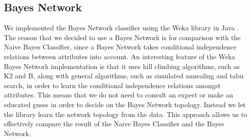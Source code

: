 \documentclass[11pt,oneside,reqno]{amsart}
\theoremstyle{definition}
\theoremstyle{definition}
\theoremstyle{remark}
\numberwithin{equation}{section}
\numberwithin{equation}{section}
\begin{document}
\subsection{Bayes Network}
We implemented the Bayes Network classifier using the Weka library in Java \cite{Weka}. The reason that we decided to use a Bayes Network is for comparison with the Naive Bayes Classifier, since a Bayes Network takes conditional independence relations between attributes into account. An interesting feature of the Weka Bayes Network implementation is that it uses hill climbing algorithms, such as K2 and B, along with general algorithms, such as simulated annealing and tabu search, in order to learn the conditional independence relations amongst attributes. This means that we do not need to consult an expert or make an educated guess in order to decide on the Bayes Network topology. Instead we let the library learn the network topology from the data. This approach allows us to effectively compare the result of the Naive Bayes Classifier and the Bayes Network.
\end{document}
